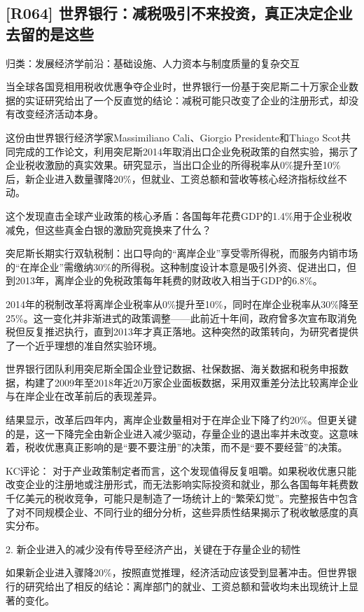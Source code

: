 \documentclass[11pt]{ctexart}
\begin{document}
\subsection{[R064] 世界银行：减税吸引不来投资，真正决定企业去留的是这些}
{\small\color{refgray}归类：发展经济学前沿：基础设施、人力资本与制度质量的复杂交互}

当全球各国竞相用税收优惠争夺企业时，世界银行一份基于突尼斯二十万家企业数据的实证研究给出了一个反直觉的结论：减税可能只改变了企业的注册形式，却没有改变经济活动本身。

这份由世界银行经济学家Massimiliano Cali、Giorgio Presidente和Thiago Scot共同完成的工作论文，利用突尼斯2014年取消出口企业免税政策的自然实验，揭示了企业税收激励的真实效果。研究显示，当出口企业的所得税率从0\%提升至10\%后，新企业进入数量骤降20\%，但就业、工资总额和营收等核心经济指标纹丝不动。

这个发现直击全球产业政策的核心矛盾：各国每年花费GDP的1.4\%用于企业税收减免，但这些真金白银的激励究竟换来了什么？

突尼斯长期实行双轨税制：出口导向的“离岸企业”享受零所得税，而服务内销市场的“在岸企业”需缴纳30\%的所得税。这种制度设计本意是吸引外资、促进出口，但到2013年，离岸企业的免税政策每年耗费的财政收入相当于GDP的6.8\%。

2014年的税制改革将离岸企业税率从0\%提升至10\%，同时在岸企业税率从30\%降至25\%。这一变化并非渐进式的政策调整——此前近十年间，政府曾多次宣布取消免税但反复推迟执行，直到2013年才真正落地。这种突然的政策转向，为研究者提供了一个近乎理想的准自然实验环境。

世界银行团队利用突尼斯全国企业登记数据、社保数据、海关数据和税务申报数据，构建了2009年至2018年近20万家企业面板数据，采用双重差分法比较离岸企业与在岸企业在改革前后的表现差异。

结果显示，改革后四年内，离岸企业数量相对于在岸企业下降了约20\%。但更关键的是，这一下降完全由新企业进入减少驱动，存量企业的退出率并未改变。这意味着，税收优惠真正影响的是“要不要注册”的决策，而不是“要不要经营”的决策。

KC评论： 对于产业政策制定者而言，这个发现值得反复咀嚼。如果税收优惠只能改变企业的注册地或注册形式，而无法影响实际投资和就业，那么各国每年耗费数千亿美元的税收竞争，可能只是制造了一场统计上的“繁荣幻觉”。完整报告中包含了对不同规模企业、不同行业的细分分析，这些异质性结果揭示了税收敏感度的真实分布。

2. 新企业进入的减少没有传导至经济产出，关键在于存量企业的韧性

如果新企业进入骤降20\%，按照直觉推理，经济活动应该受到显著冲击。但世界银行的研究给出了相反的结论：离岸部门的就业、工资总额和营收均未出现统计上显著的变化。
\end{document}
